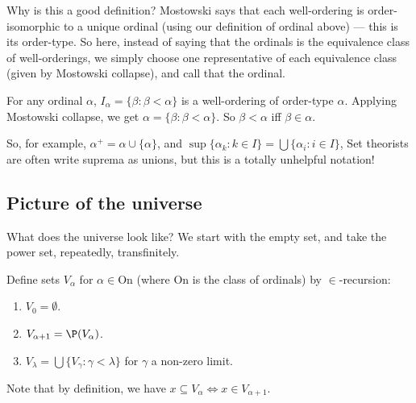 \documentclass[a4paper]{article}
\begin{document}
Why is this a good definition? Mostowski says that each well-ordering is order-isomorphic to a unique ordinal (using our definition of ordinal above) --- this is its order-type. So here, instead of saying that the ordinals is the equivalence class of well-orderings, we simply choose one representative of each equivalence class (given by Mostowski collapse), and call that the ordinal.

For any ordinal $\alpha$, $I_\alpha = \{\beta: \beta < \alpha \}$ is a well-ordering of order-type $\alpha$. Applying Mostowski collapse, we get $\alpha = \{\beta: \beta < \alpha\}$. So $\beta < \alpha$ iff $\beta \in \alpha$.

So, for example, $\alpha^+ = \alpha \cup \{\alpha\}$, and $\sup \{\alpha_k: k\in I\} = \bigcup\{\alpha_i: i\in I\}$, Set theorists are often write suprema as unions, but this is a totally unhelpful notation!

\subsection{Picture of the universe}
What does the universe look like? We start with the empty set, and take the power set, repeatedly, transfinitely.

\begin{defi}
  Define sets $V_\alpha$ for $\alpha \in \mathrm{On}$ (where $\mathrm{On}$ is the class of ordinals) by $\in$-recursion:
  \begin{enumerate}
    \item $V_0 = \emptyset$.
    \item $V_{\alpha + 1} = \P(V_\alpha)$.
    \item $V_\lambda = \bigcup\{V_\gamma: \gamma < \lambda\}$ for $\gamma$ a non-zero limit.
  \end{enumerate}
\end{defi}
\begin{center}
\end{center}
Note that by definition, we have $x\subseteq V_\alpha \Leftrightarrow x\in V_{\alpha + 1}$.
\end{document}
